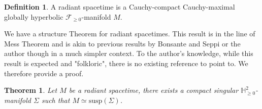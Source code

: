 \documentclass[a4paper,12pt]{article}
\def\H{\mathbb{H}}
\def\susp{\mathrm{susp}}
\def\Future{\mathcal F}
\def\susp{\mathrm{susp}}
\newtheorem{theo}{Theorem}	%
\theoremstyle{definition}
\newtheorem{defi}[lem]{Definition}	%
\begin{document}
		\begin{defi}\label{def:radiant_spacetime_cauchy_compact_cauchy_maximal} A radiant spacetime is a Cauchy-compact Cauchy-maximal globally hyperbolic $\Future_{\geq0}$-manifold $M$.
		\end{defi}
			We have a structure Theorem for radiant spacetimes. This result is in the line of Mess Theorem \cite{mess} and is akin to previous results by Bonsante and Seppi \cite{seppiH2} or the author \cite{brunswic2021Cauchy} though in a much simpler context. To the author's knowledge, while this result is expected and "folkloric", there is no existing reference to point to. We therefore provide a proof.

				\begin{theo}\label{theo:radiant_struc} Let $M$ be a radiant spacetime, there exists a compact singular $\H^2_{\geq0}$-manifold $\Sigma$ such that $M \simeq \susp(\Sigma)$.
		\end{theo}
\end{document}

